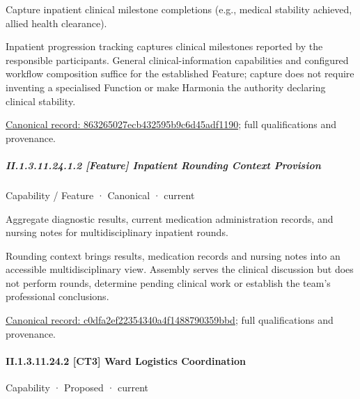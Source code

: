 Capture inpatient clinical milestone completions (e.g., medical stability achieved, allied health clearance).



Inpatient progression tracking captures clinical milestones reported by the responsible participants. General clinical-information capabilities and configured workflow composition suffice for the established Feature; capture does not require inventing a specialised Function or make Harmonia the authority declaring clinical stability.


{\footnotesize \href{../../../../continuum/strategy/capability/feature/863265027ecb432595b9c6d45adf1190.md}{Canonical record: 863265027ecb432595b9c6d45adf1190}; full qualifications and provenance.}\par
\subparagraph*{II.1.3.11.24.1.2 [Feature] Inpatient Rounding Context Provision}
\label{navigation:II.1.3.11.24.1.2}

\label{element:c0dfa2ef22354340a4f1488790359bbd}
{\small Capability / Feature · Canonical · current}\par

Aggregate diagnostic results, current medication administration records, and nursing notes for multidisciplinary inpatient rounds.



Rounding context brings results, medication records and nursing notes into an accessible multidisciplinary view. Assembly serves the clinical discussion but does not perform rounds, determine pending clinical work or establish the team's professional conclusions.


{\footnotesize \href{../../../../continuum/strategy/capability/feature/c0dfa2ef22354340a4f1488790359bbd.md}{Canonical record: c0dfa2ef22354340a4f1488790359bbd}; full qualifications and provenance.}\par
\paragraph*{II.1.3.11.24.2 [CT3] Ward Logistics Coordination}
\label{navigation:II.1.3.11.24.2}

\label{element:3249647f7b9846c899f982ab339c81f9}
{\small Capability · Proposed · current}\par

